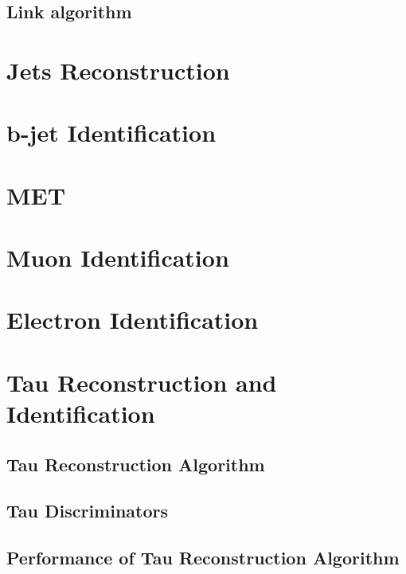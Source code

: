\subsection{Link algorithm}
\label{subsec:Linkalgorithm}

\section{Jets Reconstruction}
\label{sec:Jet}

\section{b-jet Identification}
\label{sec:bJet}

\section{MET}
\label{sec:MET}

\section{Muon Identification}
\label{sec:Muon}


\section{Electron Identification}
\label{sec:Electron}



\section{Tau Reconstruction and Identification}
\label{sec:Tau}



\subsection{Tau Reconstruction Algorithm}
\label{subsec:HPS}

\subsection{Tau Discriminators}
\label{subsec:Discriminators}

\subsection{Performance of Tau Reconstruction Algorithm}
\label{subsec:Performance}

